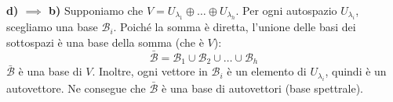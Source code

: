 {{        \bigskip

        \textbf{d) \(\implies\) b)}
        Supponiamo che \(V = U_{\lambda_1} \oplus \dots \oplus U_{\lambda_h}\).
        Per ogni autospazio \(U_{\lambda_i}\), scegliamo una base \(\mathcal{B}_i\).
        Poiché la somma è diretta, l'unione delle basi dei sottospazi è una base della somma (che è \(V\)):
        \[ \bar{\mathcal{B}} = \mathcal{B}_1 \cup \mathcal{B}_2 \cup \dots \cup \mathcal{B}_h \]
        \(\bar{\mathcal{B}}\) è una base di \(V\). Inoltre, ogni vettore in \(\mathcal{B}_i\) è un elemento di \(U_{\lambda_i}\), quindi è un autovettore.
        Ne consegue che \(\bar{\mathcal{B}}\) è una base di autovettori (base spettrale).
    }
}

